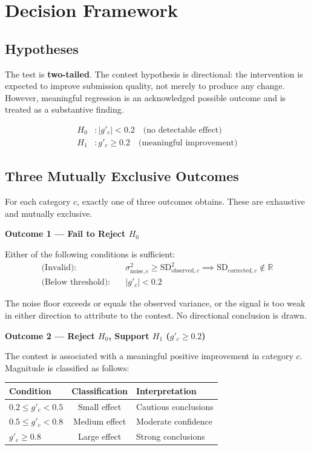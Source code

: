 \documentclass[11pt]{article}
\begin{document}
\section{Decision Framework}

\subsection{Hypotheses}

The test is \textbf{two-tailed}. The contest hypothesis is directional: the intervention is expected to improve submission quality, not merely to produce any change. However, meaningful regression is an acknowledged possible outcome and is treated as a substantive finding.

\begin{align}
H_0 &: |g'_c| < 0.2 \quad \text{(no detectable effect)} \\
H_1 &: g'_c \geq 0.2 \quad \text{(meaningful improvement)}
\end{align}

\subsection{Three Mutually Exclusive Outcomes}

For each category $c$, exactly one of three outcomes obtains. These are exhaustive and mutually exclusive.

\bigskip
\noindent\textbf{Outcome 1 --- Fail to Reject $H_0$}

\medskip
\noindent Either of the following conditions is sufficient:
\begin{align}
\text{(Invalid):} \quad & \sigma^2_{\text{noise},c} \geq \text{SD}^2_{\text{observed},c} \implies \text{SD}_{\text{corrected},c} \notin \mathbb{R} \\
\text{(Below threshold):} \quad & |g'_c| < 0.2
\end{align}

The noise floor exceeds or equals the observed variance, or the signal is too weak in either direction to attribute to the contest. No directional conclusion is drawn.

\bigskip
\noindent\textbf{Outcome 2 --- Reject $H_0$, Support $H_1$ ($g'_c \geq 0.2$)}

\medskip
\noindent The contest is associated with a meaningful positive improvement in category $c$. Magnitude is classified as follows:

\begin{center}
\begin{tabular}{lcl}
\toprule
\textbf{Condition} & \textbf{Classification} & \textbf{Interpretation} \\
\midrule
$0.2 \leq g'_c < 0.5$ & Small effect & Cautious conclusions \\
$0.5 \leq g'_c < 0.8$ & Medium effect & Moderate confidence \\
$g'_c \geq 0.8$ & Large effect & Strong conclusions \\
\bottomrule
\end{tabular}
\end{center}
\end{document}
